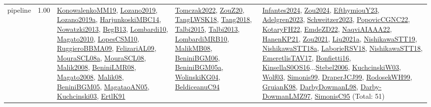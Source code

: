 {\begin{longtable}{p{3cm}r>{\raggedright\arraybackslash}p{6cm}>{\raggedright\arraybackslash}p{6cm}>{\raggedright\arraybackslash}p{8cm}}
\index{pipeline}\index{ApplicationAreas!pipeline}pipeline &  1.00 & \hyperref[detail:KonowalenkoMM19]{KonowalenkoMM19}, \hyperref[detail:Lozano2019]{Lozano2019}, \hyperref[detail:Lozano2019a]{Lozano2019a}, \hyperref[detail:HarjunkoskiMBC14]{HarjunkoskiMBC14}, \hyperref[detail:Nowatzki2013]{Nowatzki2013}, \hyperref[detail:BegB13]{BegB13}, \hyperref[detail:Lombardi10]{Lombardi10}, \hyperref[detail:Magato2010]{Magato2010}, \hyperref[detail:LopesCSM10]{LopesCSM10}, \hyperref[detail:RuggieroBBMA09]{RuggieroBBMA09}, \hyperref[detail:FelizariAL09]{FelizariAL09}, \hyperref[detail:MouraSCL08a]{MouraSCL08a}, \hyperref[detail:MouraSCL08]{MouraSCL08}, \hyperref[detail:Malik2008]{Malik2008}, \hyperref[detail:BeniniLMR08]{BeniniLMR08}, \hyperref[detail:Magato2008]{Magato2008}, \hyperref[detail:Malik08]{Malik08}, \hyperref[detail:BeniniBGM05]{BeniniBGM05}, \hyperref[detail:MagataoAN05]{MagataoAN05}, \hyperref[detail:Kuchcinski03]{Kuchcinski03}, \hyperref[detail:ErtlK91]{ErtlK91} & \hyperref[detail:Tomczak2022]{Tomczak2022}, \hyperref[detail:ZouZ20]{ZouZ20}, \hyperref[detail:TangLWSK18]{TangLWSK18}, \hyperref[detail:Tang2018]{Tang2018}, \hyperref[detail:Talbi2015]{Talbi2015}, \hyperref[detail:Talbi2013]{Talbi2013}, \hyperref[detail:LombardiMRB10]{LombardiMRB10}, \hyperref[detail:MalikMB08]{MalikMB08}, \hyperref[detail:BeniniBGM06]{BeniniBGM06}, \hyperref[detail:BeniniBGM05a]{BeniniBGM05a}, \hyperref[detail:WolinskiKG04]{WolinskiKG04}, \hyperref[detail:BeldiceanuC94]{BeldiceanuC94} & \hyperref[detail:Infantes2024]{Infantes2024}, \hyperref[detail:Zou2024]{Zou2024}, \hyperref[detail:EfthymiouY23]{EfthymiouY23}, \hyperref[detail:Adelgren2023]{Adelgren2023}, \hyperref[detail:Schweitzer2023]{Schweitzer2023}, \hyperref[detail:PopovicCGNC22]{PopovicCGNC22}, \hyperref[detail:KotaryFH22]{KotaryFH22}, \hyperref[detail:EmdeZD22]{EmdeZD22}, \hyperref[detail:NaqviAIAAA22]{NaqviAIAAA22}, \hyperref[detail:HanenKP21]{HanenKP21}, \hyperref[detail:Zou2021]{Zou2021}, \hyperref[detail:Liu2021a]{Liu2021a}, \hyperref[detail:NishikawaSTT19]{NishikawaSTT19}, \hyperref[detail:NishikawaSTT18a]{NishikawaSTT18a}, \hyperref[detail:LaborieRSV18]{LaborieRSV18}, \hyperref[detail:NishikawaSTT18]{NishikawaSTT18}, \hyperref[detail:EmeretlisTAV17]{EmeretlisTAV17}, \hyperref[detail:Bonfietti16]{Bonfietti16}, \hyperref[detail:KinsellaS0OS16]{KinsellaS0OS16}...\hyperref[detail:Stebel2006]{Stebel2006}, \hyperref[detail:KuchcinskiW03]{KuchcinskiW03}, \hyperref[detail:Wolf03]{Wolf03}, \hyperref[detail:Simonis99]{Simonis99}, \hyperref[detail:DraperJCJ99]{DraperJCJ99}, \hyperref[detail:RodosekWH99]{RodosekWH99}, \hyperref[detail:GruianK98]{GruianK98}, \hyperref[detail:DarbyDowmanL98]{DarbyDowmanL98}, \hyperref[detail:Darby-DowmanLMZ97]{Darby-DowmanLMZ97}, \hyperref[detail:SimonisC95]{SimonisC95} (Total: 51)\\

\end{longtable}}
